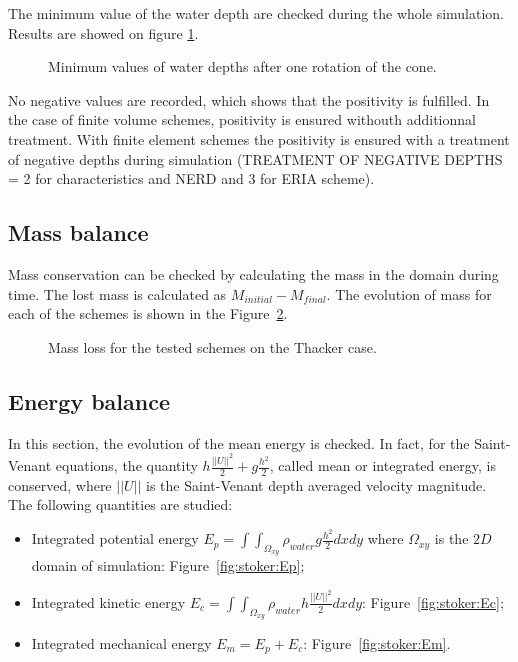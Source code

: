 The minimum value of the water depth are checked during the whole simulation. 
Results are showed on figure \ref{t2d:stoker:minmax}. 

\begin{figure}[H]
\centering
{}
\caption{Minimum values of water depths after one rotation of the cone.}
\label{t2d:stoker:minmax}
\end{figure}

No negative values are recorded, which shows that the positivity is fulfilled.
In the case of finite volume schemes, positivity is ensured withouth additionnal treatment.
With finite element schemes the positivity is ensured with a treatment of negative depths
during simulation (TREATMENT OF NEGATIVE DEPTHS = 2 for characteristics and NERD and 3 for ERIA scheme).

\subsection{Mass balance}

Mass conservation can be checked by calculating the mass in the domain during time.
The lost mass is calculated as $M_{initial} - M_{final}$.
The evolution of mass for each of the schemes is shown in the Figure~\ref{fig:stoker:VoLTime}.

\begin{figure}[H]
\centering
  \caption{Mass loss for the tested schemes on the Thacker case.}
\label{fig:stoker:VoLTime}
\end{figure}

\subsection{Energy balance}

In this section, the evolution of the mean energy is checked. In fact, for the Saint-Venant equations,
the quantity $h \frac{||U||^2}{2} + g \frac{h^2}{2}$, called mean or integrated energy, is conserved,
where $||U||$ is the Saint-Venant depth averaged velocity magnitude.
The following quantities are studied:
\begin{itemize}
\item Integrated potential energy \textbf{$E_p =\int\int_{\Omega_{xy}}\rho_{water} g \frac{h^2}{2} dxdy$} where $\Omega_{xy}$ is the $2D$ domain of simulation: Figure~\ref{fig:stoker:Ep};
\item Integrated kinetic energy \textbf{$E_c =\int\int_{\Omega_{xy}} \rho_{water} h \frac{||U||^2}{2} dxdy$}: Figure~\ref{fig:stoker:Ec};
\item Integrated mechanical energy \textbf{$E_m = E_p + E_c$}: Figure~\ref{fig:stoker:Em}.
\end{itemize}

